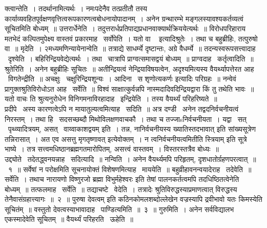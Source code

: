 \documentclass[11pt, openany]{book}
\begin{document}
क्त्वान्तेति~। तदर्थानामित्यर्थः~। नमःपदेनैव तत्प्रतीतौ तस्य कार्याव्यवहितपूर्वक्षणवृत्तित्वरूपकारणत्वबोधनायोपादानम्~। अनेन ग्रन्थारम्भे मङ्गलस्यावश्यकर्तव्यत्वं सूचितमिति बोध्यम्~॥ उत्तरार्धेनेति~। तदुत्तरार्धप्रतिपाद्यप्रधानवाक्यार्थक्रिययेत्यर्थः~॥ विरोधपरिहाराय मतभेदं कल्पितमुपेक्ष्य वास्तवं प्रकारमाह \textendash\ सर्वोपेति~। {\qt यतो वा \textendash\ } इत्यादिश्रुतेः~। तथा च बहुब्रीहिः, तत्पुरुषो वा~॥ मृदेति~। २मध्यमणिन्यायेनान्वेति~॥ तत्राद्ये साधर्म्ये दृष्टान्तः, अग्रे वैधर्म्ये~॥ तदन्यस्वरूपसत्त्वादाह \textendash\ दृश्येति~। बहिरिन्द्रियवेद्येत्यर्थः~। तथा \textendash\ चात्रापि प्राग्वत्समासद्वयं बोध्यम्~॥ प्राग्वदाह \textendash\ कर्तृत्वादिति~॥ श्रुतेरिति~। अनेन बहुब्रीहिः सूचितः~॥ अतीन्द्रियत्वं नेन्द्रियाविषयत्वेन, अदृश्यमित्यस्य वैयर्थ्यापत्तेरत आह \textendash\ विगतेन्द्रीति~॥ अचक्षुः \textendash\ चक्षुरिन्द्रियशून्यः~। आदिना \textendash\ {\qt स शृणोत्यकर्णः} इत्यादिः परिग्रहः~॥ नन्वेवं प्रागुक्तश्रुतिविरोधोऽत आह \textendash\ सर्वेति~॥ विश्वं साक्षात्कुर्वन्नपि नास्मदादिवदिन्द्रियद्वारा किं तु तथेति भावः~॥ {\qt यतो वाचः} ति श्रुत्यनुरोधेन विनिगमनाविरहादाह \textendash\ इन्द्रियेति~। तस्य वैयर्थ्यं परिहरिष्यते~॥\\

प्रदीपे \textendash\ अस्य कारणत्वेऽपि न मायातुल्यत्वमित्याह \textendash\ सदिति~॥ अत्र दण्डी \textendash\ {\qt अनेन तद्वदनिर्वचनीयत्वं निरस्तम्~। तथा हि \textendash\ सदसच्छब्दौ मिथोविलक्षणवाचकौ~। तथा च तज्जाsनिर्वचनीयता~। यद्वा \textendash\ सत् \textendash\ पृथ्व्यादित्रयम्, असत् \textendash\ वाय्वाकाशद्वयम्} इति~। तन्न, {\qt नानिर्वचनीयस्य ख्यातिस्तदभावात्} इति सांख्यसूत्रेण तन्निरासात्~। अत एव {\qt असत्तु मृगतृष्णावत्} इत्येवोक्तम्~। न त्वनिर्वचनीयत्वमितीति {\qt स्त्रियाम्} इति सूत्रे भाष्ये~। तत्र सत्त्वमधिष्ठानब्रह्मगतमारोपितम्, असत्त्वं वास्तवम्~। विस्तरस्तत्रैव बोध्यः~॥\\

उद्द्योते \textendash\ तदेतद्ध्वनयन्नाह \textendash\ सदित्यादि~॥ नन्विति~। अनेन वैयर्थ्यमपि परिहृतम्, दृशधातोर्ग्रहणपरत्वात्~॥~१~॥ सर्वेषां न परोक्षमिति सूचनायोक्तं विशेषणमित्याह \textendash\ माययेति~॥ बहुव्रीहावनन्वयादेराह \textendash\ तदेवेति~॥ सर्वेति~। तथाच {\qt नारायणो} विष्णुरजो ब्रह्मा विभुर्महेश्वरः इति तेषां पालनकर्तत्वमपि तदधिष्ठितत्वेनेति बोध्यम्~॥ तत्फलमाह \textendash\ सर्वेति~॥ तद्याचष्टे \textendash\ वेदेति~। तत्रादेः श्रुतिविरुद्धस्याप्रमाणत्वात् विरुद्धस्य तेनैवासंग्रहात्त्यागः~॥~२~॥ {\qt पुरुषा देवत्वम्} इति कठिनकोमलशब्दोल्लेखेन वज्रस्यापि द्रवीभावो यतः किमस्येति सूचितंम्~॥ वस्तुतो देवत्वस्याभावादाह \textendash\ पाण्डित्यमिति~॥~३~॥ गुरुमिति~। अनेन सर्वविद्यालभ एकस्मादेवेति सूचितम्~॥ वैयर्थ्यं परिहरति \textendash\ ऊहेति~॥\\
\end{document}
